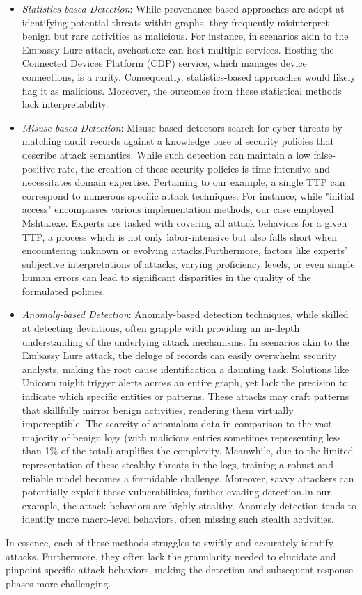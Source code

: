 \begin{itemize}
    \item \textit{Statistics-based Detection}: While provenance-based approaches are adept at identifying potential threats within graphs, they frequently misinterpret benign but rare activities as malicious. For instance, in scenarios akin to the Embassy Lure attack, svchost.exe can host multiple services. Hosting the Connected Devices Platform (CDP) service, which manages device connections, is a rarity. Consequently, statistics-based approaches would likely flag it as malicious. Moreover, the outcomes from these statistical methods lack interpretability.
    \item \textit{Misuse-based Detection}: Misuse-based detectors search for cyber threats by matching audit records against a knowledge base of security policies that describe attack semantics. While such detection can maintain a low false-positive rate, the creation of these security policies is time-intensive and necessitates domain expertise. Pertaining to our example, a single TTP can correspond to numerous specific attack techniques. For instance, while "initial access" encompasses various implementation methods, our case employed Mshta.exe. Experts are tasked with covering all attack behaviors for a given TTP, a process which is not only labor-intensive but also falls short when encountering unknown or evolving attacks.Furthermore, factors like experts' subjective interpretations of attacks, varying proficiency levels, or even simple human errors can lead to significant disparities in the quality of the formulated policies.
    \item \textit{Anomaly-based Detection}: Anomaly-based detection techniques, while skilled at detecting deviations, often grapple with providing an in-depth understanding of the underlying attack mechanisms. In scenarios akin to the Embassy Lure attack, the deluge of records can easily overwhelm security analysts, making the root cause identification a daunting task. Solutions like Unicorn might trigger alerts across an entire graph, yet lack the precision to indicate which specific entities or patterns. These attacks may craft patterns that skillfully mirror benign activities, rendering them virtually imperceptible. The scarcity of anomalous data in comparison to the vast majority of benign logs (with malicious entries sometimes representing less than 1\% of the total) amplifies the complexity. Meanwhile, due to the limited representation of these stealthy threats in the logs, training a robust and reliable model becomes a formidable challenge. Moreover, savvy attackers can potentially exploit these vulnerabilities, further evading detection.In our example, the attack behaviors are highly stealthy. Anomaly detection tends to identify more macro-level behaviors, often missing such stealth activities.
\end{itemize}
In essence, each of these methods struggles to swiftly and accurately identify attacks. Furthermore, they often lack the granularity needed to elucidate and pinpoint specific attack behaviors, making the detection and subsequent response phases more challenging.



